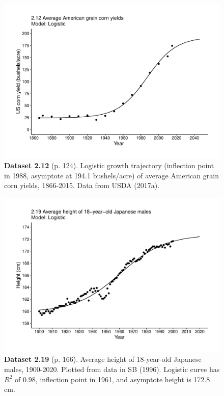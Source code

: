 \documentclass[aps,rmp,preprint,superscriptaddress,10pt,onecolumn]{article}
\begin{document}
\clearpage
\begin{figure}[h]
\includegraphics[width=\textwidth]{output/figs-ggplot/2.12.pdf}
\caption*{\textbf{Dataset 2.12} (p. 124). Logistic growth trajectory (inflection point in 1988, asymptote at 194.1 bushels/acre) of average American grain corn yields, 1866-2015. Data from USDA (2017a).}
\end{figure}
	
\clearpage
\begin{figure}[h]
\includegraphics[width=\textwidth]{output/figs-ggplot/2.19.pdf}
\caption*{\textbf{Dataset 2.19} (p. 166). Average height of 18-year-old Japanese males, 1900-2020. Plotted from data in SB (1996). Logistic curve has $R^2$ of 0.98, inflection point in 1961, and asymptote height is 172.8 cm. }
\end{figure}
	
\end{document}
